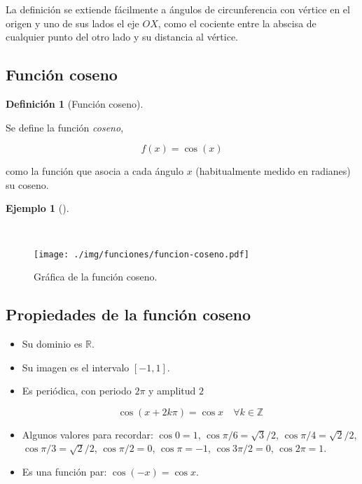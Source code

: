 \documentclass[
  a4paper,
]{scrreport}
\theoremstyle{definition}
\theoremstyle{definition}
\newtheorem{example}{Ejemplo}[chapter]
\theoremstyle{definition}
\newtheorem{definition}{Definición}[chapter]
\theoremstyle{plain}
\theoremstyle{plain}
\theoremstyle{plain}
\theoremstyle{remark}
\begin{document}
La definición se extiende fácilmente a ángulos de circunferencia con
vértice en el origen y uno de sus lados el eje \(OX\), como el cociente
entre la abscisa de cualquier punto del otro lado y su distancia al
vértice.

\subsection{Función coseno}\label{funciuxf3n-coseno}

\begin{definition}[Función
coseno]\protect\hypertarget{def-funcion-coseno}{}\label{def-funcion-coseno}

Se define la función \emph{coseno},

\[f(x)=\cos(x)\]

como la función que asocia a cada ángulo \(x\) (habitualmente medido en
radianes) su coseno.

\end{definition}

\begin{example}[]\protect\hypertarget{exm-grafica-funcion-coseno}{}\label{exm-grafica-funcion-coseno}

~

\begin{figure}[H]

{\centering \texttt{[image: ./img/funciones/funcion-coseno.pdf]}

}

\caption{Gráfica de la función coseno.}

\end{figure}%

\end{example}

\subsection{Propiedades de la función
coseno}\label{propiedades-de-la-funciuxf3n-coseno}

\begin{itemize}
\item
  Su dominio es \(\mathbb{R}\).
\item
  Su imagen es el intervalo \([-1,1]\).
\item
  Es periódica, con periodo \(2\pi\) y amplitud \(2\)

  \[\cos (x+2k\pi)= \cos x\quad \forall k\in \mathbb{Z}\]
\item
  Algunos valores para recordar: \(\cos 0=1\),
  \(\cos \pi/6= \sqrt{3}/2\), \(\cos \pi/4=\sqrt{2}/2\),
  \(\cos \pi/3= \sqrt{2}/2\), \(\cos \pi/2 =0\), \(\cos \pi = -1\),
  \(\cos 3\pi/2=0\), \(\cos 2\pi=1\).
\item
  Es una función par: \(\cos(-x)=\cos x\).
\end{itemize}
\end{document}
